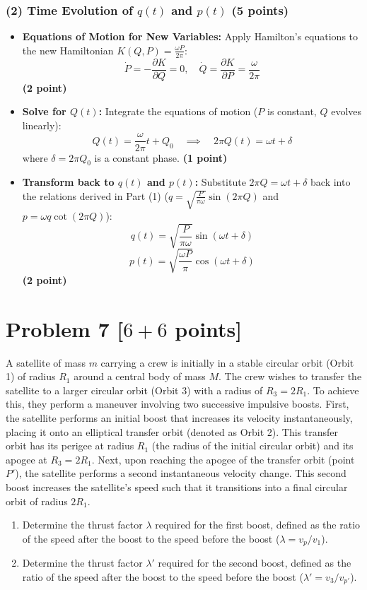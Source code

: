 \documentclass[11pt, a4paper]{article} %
\begin{document}
\subsubsection*{(2) Time Evolution of $q(t)$ and $p(t)$ (5 points)}
\begin{itemize}
    \item \textbf{Equations of Motion for New Variables:}
    Apply Hamilton's equations to the new Hamiltonian $K(Q, P) = \frac{\omega P}{2\pi}$:
    \[ \dot{P} = -\frac{\partial K}{\partial Q} = 0, \quad \dot{Q} = \frac{\partial K}{\partial P} = \frac{\omega}{2\pi} \]
    \hfill \textbf{(2 point)}

    \item \textbf{Solve for $Q(t)$:}
    Integrate the equations of motion ($P$ is constant, $Q$ evolves linearly):
    \[ Q(t) = \frac{\omega}{2\pi} t + Q_0 \quad \implies \quad 2\pi Q(t) = \omega t + \delta \]
    where $\delta = 2\pi Q_0$ is a constant phase.
    \hfill \textbf{(1 point)}

    \item \textbf{Transform back to $q(t)$ and $p(t)$:}
    Substitute $2\pi Q = \omega t + \delta$ back into the relations derived in Part (1) ($q = \sqrt{\frac{P}{\pi \omega}}\sin(2\pi Q)$ and $p = \omega q \cot(2\pi Q)$):
    \[ q(t) = \sqrt{\frac{P}{\pi \omega}} \sin(\omega t + \delta) \]
    \[ p(t) = \sqrt{\frac{\omega P}{\pi}} \cos(\omega t + \delta) \]
    \hfill \textbf{(2 point)}
\end{itemize}


\newpage
\section*{Problem 7 [$6+6$ points]}
A satellite of mass $m$ carrying a crew is initially in a stable circular orbit (Orbit 1) of radius $R_1$ around a central body of mass $M$. The crew wishes to transfer the satellite to a larger circular orbit (Orbit 3) with a radius of $R_3 = 2R_1$. To achieve this, they perform a maneuver involving two successive impulsive boosts. 
First, the satellite performs an initial boost that increases its velocity instantaneously, placing it onto an elliptical transfer orbit (denoted as Orbit 2). This transfer orbit has its perigee at radius $R_1$ (the radius of the initial circular orbit) and its apogee at $R_3 = 2R_1$.
Next, upon reaching the apogee of the transfer orbit (point $P'$), the satellite performs a second instantaneous velocity change. This second boost increases the satellite's speed such that it transitions into a final circular orbit of radius $2R_1$.
\begin{enumerate}
    \item[(1)] Determine the thrust factor $\lambda$ required for the first boost, defined as the ratio of the speed after the boost to the speed before the boost ($\lambda = v_{p} / v_1$).
    \item[(2)] Determine the thrust factor $\lambda'$ required for the second boost, defined as the ratio of the speed after the boost to the speed before the boost ($\lambda' = v_3 / v_{p'}$).
\end{enumerate}
\end{document}
